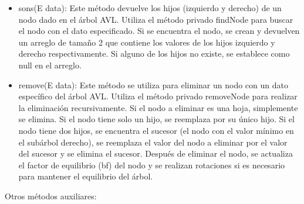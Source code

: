 \begin{itemize}
\item sons(E data): Este método devuelve los hijos (izquierdo y derecho) de un nodo dado en el árbol AVL. Utiliza el método privado findNode para buscar el nodo con el dato especificado. Si se encuentra el nodo, se crean y devuelven un arreglo de tamaño 2 que contiene los valores de los hijos izquierdo y derecho respectivamente. Si alguno de los hijos no existe, se establece como null en el arreglo.

\item remove(E data): Este método se utiliza para eliminar un nodo con un dato específico del árbol AVL. Utiliza el método privado removeNode para realizar la eliminación recursivamente. Si el nodo a eliminar es una hoja, simplemente se elimina. Si el nodo tiene solo un hijo, se reemplaza por su único hijo. Si el nodo tiene dos hijos, se encuentra el sucesor (el nodo con el valor mínimo en el subárbol derecho), se reemplaza el valor del nodo a eliminar por el valor del sucesor y se elimina el sucesor. Después de eliminar el nodo, se actualiza el factor de equilibrio (bf) del nodo y se realizan rotaciones si es necesario para mantener el equilibrio del árbol.
\end{itemize}

Otros métodos auxiliares:

